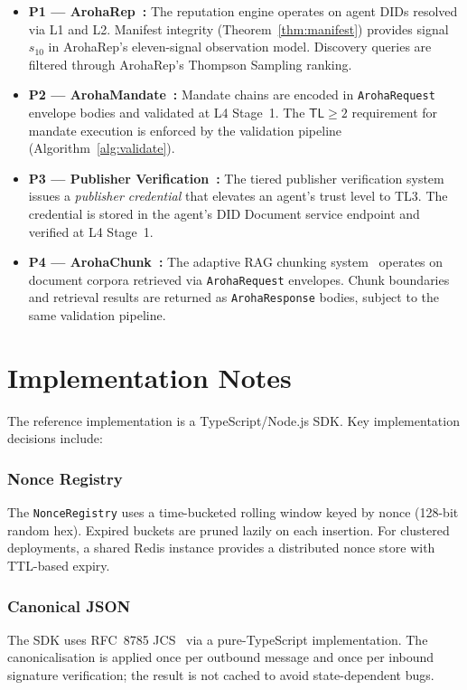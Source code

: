 \documentclass[conference]{IEEEtran}
\newcommand{\TL}{\mathsf{TL}}
\begin{document}
\begin{itemize}
  \item \textbf{P1 — ArohaRep~\cite{aroha2025p1}:} The
    reputation engine operates on agent DIDs resolved via L1
    and L2. Manifest integrity (Theorem~\ref{thm:manifest})
    provides signal $s_{10}$ in ArohaRep's eleven-signal
    observation model. Discovery queries are filtered through
    ArohaRep's Thompson Sampling ranking.
  \item \textbf{P2 — ArohaMandate~\cite{aroha2025p2}:} Mandate
    chains are encoded in \texttt{ArohaRequest} envelope bodies
    and validated at L4 Stage~1. The $\TL \geq 2$ requirement
    for mandate execution is enforced by the validation pipeline
    (Algorithm~\ref{alg:validate}).
  \item \textbf{P3 — Publisher Verification~\cite{aroha2025p3}:}
    The tiered publisher verification system issues a
    \textit{publisher credential} that elevates an agent's
    trust level to TL3. The credential is stored in the agent's
    DID Document service endpoint and verified at L4
    Stage~1.
  \item \textbf{P4 — ArohaChunk~\cite{aroha2025p4}:} The
    adaptive RAG chunking system~\cite{lewis2020rag} operates
    on document corpora retrieved via \texttt{ArohaRequest}
    envelopes. Chunk boundaries and retrieval results are
    returned as \texttt{ArohaResponse} bodies, subject to the
    same validation pipeline.
\end{itemize}

\section{Implementation Notes}
\label{sec:impl}

The reference implementation is a TypeScript/Node.js SDK. Key
implementation decisions include:

\subsubsection{Nonce Registry}
The \texttt{NonceRegistry} uses a time-bucketed rolling window
keyed by nonce (128-bit random hex). Expired buckets are pruned
lazily on each insertion. For clustered deployments, a shared
Redis instance provides a distributed nonce store with TTL-based
expiry.

\subsubsection{Canonical JSON}
The SDK uses RFC~8785 JCS~\cite{jsoncanon} via a pure-TypeScript
implementation. The canonicalisation is applied once per
outbound message and once per inbound signature verification;
the result is not cached to avoid state-dependent bugs.
\end{document}
